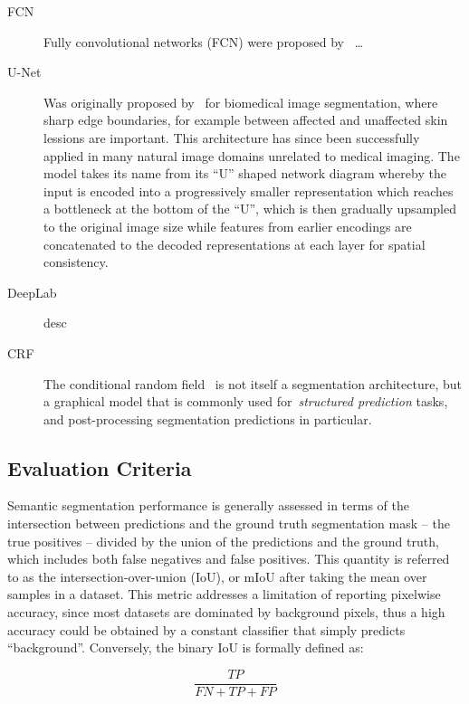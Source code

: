 \documentclass[11pt]{article} %
\begin{document}
\begin{description}
\item[FCN] Fully convolutional networks (FCN) were proposed 
by~\cite{long2015fully} \dots

\item[U-Net] Was originally proposed by~\cite{ronneberger2015unet} for 
biomedical image segmentation, where sharp edge boundaries, for example between 
affected and unaffected skin lessions are important. This architecture has 
since been successfully applied in many natural image domains unrelated to 
medical imaging. 
The model takes its name from its ``U'' shaped network diagram whereby the
input is encoded into a progressively smaller representation which reaches a 
bottleneck at the bottom of the ``U'', which is then gradually upsampled to the 
original image size while features from earlier encodings are concatenated to 
the decoded representations at each layer for spatial consistency.

\item[DeepLab] desc

\item[CRF] The conditional random field~\cite{krahenbuhl2011efficient} is not
itself a segmentation architecture, but a graphical model that is commonly used
for~\emph{structured prediction} tasks, and post-processing segmentation
predictions in particular.

\end{description}

\subsection{Evaluation Criteria}

Semantic segmentation performance is generally assessed in terms of the
intersection between predictions and the ground truth segmentation mask -- the
true positives -- divided by the union of the predictions and the ground truth, 
which includes both false negatives and false positives. This quantity is
referred to as the intersection-over-union (IoU), or mIoU after taking the
mean over samples in a dataset. This metric addresses a limitation of reporting 
pixelwise accuracy, since most datasets are dominated by background pixels,
thus a high accuracy could be obtained by a constant classifier that simply
predicts ``background''. Conversely, the binary IoU is formally defined as:

\begin{equation}
\frac{TP}{FN + TP + FP}
\end{equation}
\end{document}
